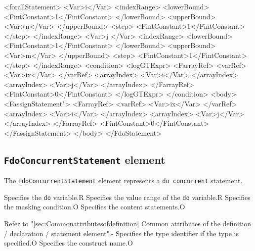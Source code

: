 \begin{XcodeMLFExample}
<forallStatement>
  <Var>i</Var>
  <indexRange>
    <lowerBound>
      <FintConstant>1</FintConstant>
    </lowerBound>
    <upperBound>
      <Var>n</Var>
    </upperBound>
    <step>
      <FintConstant>1</FintConstant>
    </step>
  </indexRange>
    <Var>j </Var>
  <indexRange>
    <lowerBound>
      <FintConstant>1</FintConstant>
    </lowerBound>
    <upperBound>
      <Var>m</Var>
    </upperBound>
    <step>
      <FintConstant>1</FintConstant>
    </step>
  </indexRange>
  <condition>
     <logGTExpr>
       <FarrayRef>
         <varRef>
           <Var>ix</Var>
         </varRef>
         <arrayIndex>
           <Var>i</Var>
         </arrayIndex>
         <arrayIndex>
           <Var>j</Var>
         </arrayIndex>
       </FarrayRef>
       <FintConstant>0</FintConstant>
     </logGTExpr>
   </condition>
  <body>
    <FassignStatement">
      <FarrayRef>
        <varRef>
          <Var>ix</Var>
        </varRef>
        <arrayIndex>
          <Var>i</Var>
        </arrayIndex>
        <arrayIndex>
          <Var>j</Var>
        </arrayIndex>
      </FarrayRef>
      <FintConstant>0</FintConstant>
    </FassignStatement>
  </body>
</FdoStatement>
\end{XcodeMLFExample}


\subsection{ {\tt FdoConcurrentStatement} element}

The {\tt FdoConcurrentStatement} element represents a {\tt do concurrent} statement.


\begin{XcodeMLChildElements}
{Specifies the {\tt do} variable.}{R}
{Specifies the value range of the {\tt do} variable.}{R}
{Specifies the masking condition.}{O}
{Specifies the content statements.}{O}
\end{XcodeMLChildElements}

\begin{XcodeMLAttributes}
{Refer to "\ref{sec:Commonattributesofdefinition} Common attributes of the definition / declaration / statement element".}{-}
{Specifies the type identifier if the type is specified.}{O}
{Specifies the construct name.}{O}
\end{XcodeMLAttributes}


